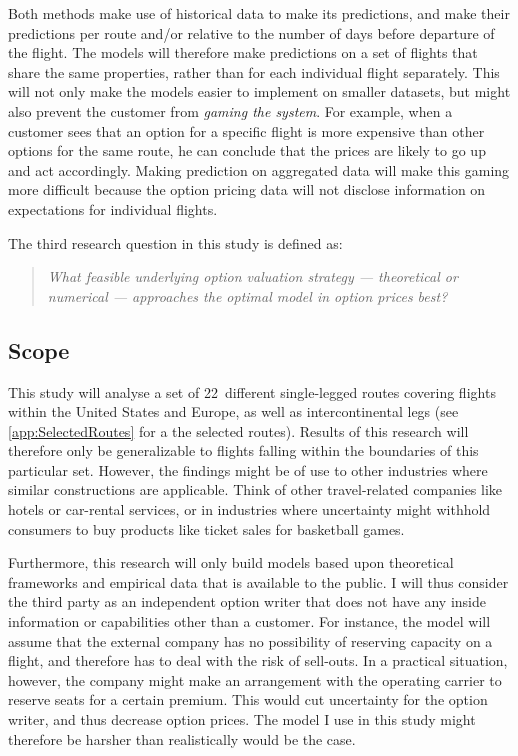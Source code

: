 Both methods make use of historical data to make its predictions, and make their predictions per route and/or relative to the number of days before departure of the flight. The models will therefore make predictions on a set of flights that share the same properties, rather than for each individual flight separately. This will not only make the models easier to implement on smaller datasets, but might also prevent the customer from \textit{gaming the system}. For example, when a customer sees that an option for a specific flight is more expensive than other options for the same route, he can conclude that the prices are likely to go up and act accordingly. Making prediction on aggregated data will make this gaming more difficult because the option pricing data will not disclose information on expectations for individual flights.

\noindent
The third research question in this study is defined as:

\begin{quote}\emph{What feasible underlying option valuation strategy --- theoretical or numerical --- approaches the optimal model in option prices best?}\end{quote}

\subsection{Scope}
This study will analyse a set of 22~different single-legged routes covering flights within the United States and Europe, as well as intercontinental legs (see \cref{app:SelectedRoutes} for a the selected routes). Results of this research will therefore only be generalizable to flights falling within the boundaries of this particular set. However, the findings might be of use to other industries where similar constructions are applicable. Think of other travel-related companies like hotels or car-rental services, or in industries where uncertainty might withhold consumers to buy products like ticket sales for basketball games.

Furthermore, this research will only build models based upon theoretical frameworks and empirical data that is available to the public. I will thus consider the third party as an independent option writer that does not have any inside information or capabilities other than a customer. For instance, the model will assume that the external company has no possibility of reserving capacity on a flight, and therefore has to deal with the risk of sell-outs. In a practical situation, however, the company might make an arrangement with the operating carrier to reserve seats for a certain premium. This would cut uncertainty for the option writer, and thus decrease option prices. The model I use in this study might therefore be harsher than realistically would be the case.
